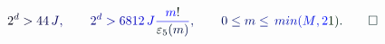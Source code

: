 \documentclass[12pt]{article}
\begin{document}
\makeatletter
\renewcommand*{\@textcolor}[3]{%
  \protect\leavevmode
  \begingroup
    \color#1{#2}#3%
  \endgroup
}
\makeatother
\begin{displaymath}
\mathcolor[RGB]{0,0,15}{2} ^ { \mathcolor[RGB]{0,0,30}{d} } \mathcolor[RGB]{0,0,45}{>} \mathcolor[RGB]{0,0,60}{4} \mathcolor[RGB]{0,0,75}{4} \, \mathcolor[RGB]{0,0,90}{J} \mathcolor[RGB]{0,0,105}{,} \mathcolor[RGB]{0,0,120}{\qquad
2} ^ { \mathcolor[RGB]{0,0,135}{d} } \mathcolor[RGB]{0,0,150}{>} \mathcolor[RGB]{0,0,165}{6} \mathcolor[RGB]{0,0,180}{8} \mathcolor[RGB]{0,0,195}{1} \mathcolor[RGB]{0,0,210}{2} \, \mathcolor[RGB]{0,0,225}{J} \mathcolor[RGB]{0,0,240}{\frac { \mathcolor[RGB]{0,0,255}{m} \mathcolor[RGB]{0,15,0}{!} } { \mathcolor[RGB]{0,15,15}{\varepsilon} _ { \mathcolor[RGB]{0,15,30}{5} } \mathcolor[RGB]{0,15,45}{(} \mathcolor[RGB]{0,15,60}{m} \mathcolor[RGB]{0,15,75}{)} } } \mathcolor[RGB]{0,15,90}{,
\qquad
0} \mathcolor[RGB]{0,15,105}{\leq} \mathcolor[RGB]{0,15,120}{m} \mathcolor[RGB]{0,15,135}{\leq} \mathcolor[RGB]{0,15,150}{\operatorname*} { \mathcolor[RGB]{0,15,165}{m} \mathcolor[RGB]{0,15,180}{i} \mathcolor[RGB]{0,15,195}{n} } \mathcolor[RGB]{0,15,210}{(} \mathcolor[RGB]{0,15,225}{M} \mathcolor[RGB]{0,15,240}{,} \mathcolor[RGB]{0,15,255}{2} \mathcolor[RGB]{0,30,0}{1} \mathcolor[RGB]{0,30,15}{)} \mathcolor[RGB]{0,30,30}{.
\qedhere}
\end{displaymath}
\end{document}
